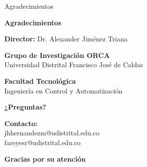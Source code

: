 \documentclass[10pt,xcolor={dvipsnames}]{beamer}
\begin{document}
\begin{frame}{Agradecimientos}
\begin{center}
\Large
\textbf{Agradecimientos}

\vspace{1cm}
\normalsize

\textbf{Director:} Dr. Alexander Jiménez Triana

\vspace{0.5cm}

\textbf{Grupo de Investigación ORCA}\\
Universidad Distrital Francisco José de Caldas

\vspace{0.5cm}

\textbf{Facultad Tecnológica}\\
Ingeniería en Control y Automatización

\vspace{1cm}

\end{center}
\end{frame}

\begin{frame}
\begin{center}
\Huge
\textbf{¿Preguntas?}

\vspace{2cm}
\normalsize

\textbf{Contacto:}\\
\vspace{0.3cm}
jhhernandezm@udistrital.edu.co\\
fareyesr@udistrital.edu.co

\vspace{1.5cm}

\Large
\textbf{Gracias por su atención}
\end{center}
\end{frame}

\appendix
\end{document}
